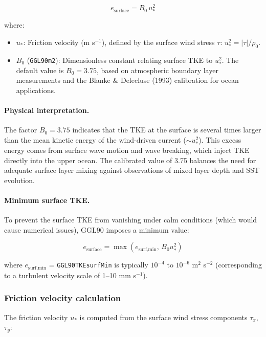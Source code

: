 \documentclass[12pt,letterpaper]{article}
\begin{document}
\begin{equation}
e_{\text{surface}} = B_0 \, u_*^2
\label{eq:surface_bc}
\end{equation}

where:
\begin{itemize}
\item $u_*$: Friction velocity (m s$^{-1}$), defined by the surface wind stress $\tau$: $u_*^2 = |\tau| / \rho_0$.
\item $B_0$ (\verb|GGL90m2|): Dimensionless constant relating surface TKE to $u_*^2$. The default value is $B_0 = 3.75$, based on atmospheric boundary layer measurements and the Blanke \& Delecluse (1993) calibration for ocean applications.
\end{itemize}

\paragraph{Physical interpretation.} The factor $B_0 = 3.75$ indicates that the TKE at the surface is several times larger than the mean kinetic energy of the wind-driven current ($\sim u_*^2$). This excess energy comes from surface wave motion and wave breaking, which inject TKE directly into the upper ocean. The calibrated value of 3.75 balances the need for adequate surface layer mixing against observations of mixed layer depth and SST evolution.

\paragraph{Minimum surface TKE.} To prevent the surface TKE from vanishing under calm conditions (which would cause numerical issues), GGL90 imposes a minimum value:

\begin{equation}
e_{\text{surface}} = \max(e_{\text{surf,min}}, \, B_0 u_*^2)
\label{eq:surface_bc_min}
\end{equation}

where $e_{\text{surf,min}}$ = \verb|GGL90TKEsurfMin| is typically $10^{-4}$ to $10^{-6}$ m$^2$ s$^{-2}$ (corresponding to a turbulent velocity scale of 1--10 mm s$^{-1}$).

\subsubsection{Friction velocity calculation}

The friction velocity $u_*$ is computed from the surface wind stress components $\tau_x$, $\tau_y$:
\end{document}
